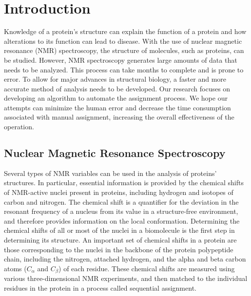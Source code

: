 \documentclass[12pt, letter]{article}
\begin{document}
\section{Introduction}
\label{sub:introduction}
Knowledge of a protein's structure can explain the function of a protein and how alterations to its function can lead to disease. With the use of nuclear magnetic resonance (NMR) spectroscopy, the structure of molecules, such as proteins, can be studied. However, NMR spectroscopy generates large amounts of data that needs to be analyzed. This process can take months to complete and is prone to error. To allow for major advances in structural biology, a faster and more accurate method of analysis needs to be developed. Our research focuses on developing an algorithm to automate the assignment process. We hope our attempts can minimize the human error and decrease the time consumption associated with manual assignment, increasing the overall effectiveness of the operation.

\subsection{Nuclear Magnetic Resonance Spectroscopy} %
\label{sub:nmr}
Several types of NMR variables can be used in the analysis of proteins' structures. In particular, essential information is provided by the chemical shifts of NMR-active nuclei present in proteins, including hydrogen and isotopes of carbon and nitrogen. The chemical shift is a quantifier for the deviation in the resonant frequency of a nucleus from its value in a structure-free environment, and therefore provides information on the local conformation. Determining the chemical shifts of all or most of the nuclei in a biomolecule is the first step in determining its structure. An important set of chemical shifts in a protein are those corresponding to the nuclei in the backbone of the protein polypeptide chain, including the nitrogen, attached hydrogen, and the alpha and beta carbon atoms ($C_\alpha$ and $C_{\beta}$) of each residue. These chemical shifts are measured using various three-dimensional NMR experiments, and then matched to the individual residues in the protein in a process called sequential assignment.
\end{document}
